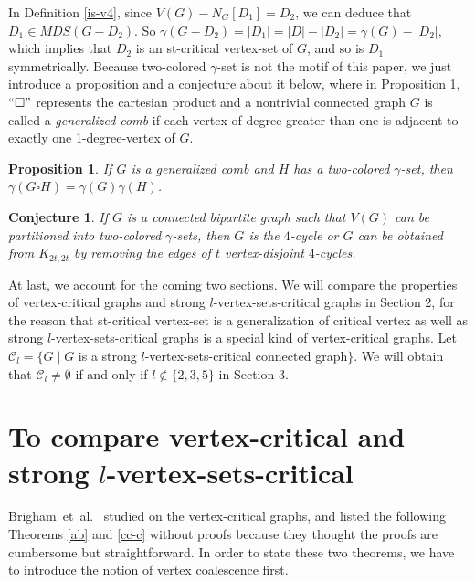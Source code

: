 \documentclass[a4paper,11pt]{article}
\numberwithin{equation}{section}
\newtheorem{con}[thm]{Conjecture}
\newtheorem{pro}[thm]{Proposition}
\begin{document}
\noindent In Definition \ref{is-v4}, since $V(G)-N_G[D_1]=D_2$, we can deduce that $D_1\in \underline{MDS}(G-D_2)$. So $\gamma(G-D_2)=|D_1|=|D|-|D_2|=\gamma(G)-|D_2|$, which implies that $D_2$  is an st-critical vertex-set of $G$, and so is $D_1$ symmetrically. Because two-colored  $\gamma$-set is not the motif of this paper, we just introduce a proposition and a conjecture about it below, where in Proposition \ref{twc}, $``\square"$ represents the cartesian product and a nontrivial connected graph $G$ is called a \emph{generalized comb} if each vertex of degree greater than one is adjacent to exactly one 1-degree-vertex of $G$.

\begin{pro}\label{twc}\emph{\cite{Hartnell0}}
If $G$ is a generalized comb and $H$ has a two-colored $\gamma$-set, then $\gamma(G \square H)=\gamma(G)\gamma(H)$.
\end{pro}

\begin{con}\label{twc2}\emph{\cite{Hartnell4}}
If $G$ is a connected bipartite graph such that $V(G)$ can be partitioned into two-colored $\gamma$-sets, then $G$ is the $4$-cycle or $G$ can be obtained from $K_{2t,2t}$ by removing the edges of $t$ vertex-disjoint $4$-cycles.
\end{con}

\medskip

At last, we account for the coming two sections. We will compare the properties of vertex-critical graphs and strong $l$-vertex-sets-critical graphs in Section 2, for the reason that
st-critical vertex-set is a generalization of critical vertex as well as strong $l$-vertex-sets-critical graphs is a special kind of vertex-critical graphs. Let $\mathscr{C}_l=\{G\mid G$ is a strong $l$-vertex-sets-critical connected graph$\}$. We will obtain that $\mathscr{C}_l\neq\emptyset$ if and only if $l\notin\{2,3,5\}$ in Section 3.

\section{To compare vertex-critical and strong $l$-vertex-sets-critical}
%
Brigham~et~al.~\cite{Brigham2} studied on the vertex-critical graphs, and listed the following Theorems \ref{ab} and \ref{cc-c} without proofs because they thought the proofs are cumbersome but straightforward. In order to state these two theorems, we have to introduce the notion of vertex coalescence first.
\end{document}
